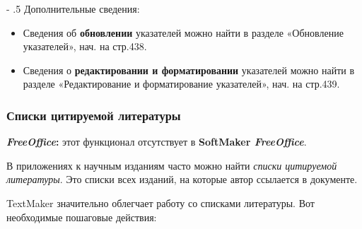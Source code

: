 ﻿\documentclass[a4paper,10pt]{article}
\makeatletter
\renewcommand\paragraph{%
   \@startsection{paragraph}{4}{0mm}%
      {-\baselineskip}%
      {.5\baselineskip}%
      {\normalfont\normalsize\bfseries}}
\makeatother
\begin{document}
\paragraph{Дополнительные сведения:}
\begin{itemize}
 \item Сведения об \textbf{обновлении} указателей можно найти в разделе «Обновление указателей», нач. на стр.438.
 \item Сведения о \textbf{редактировании и форматировании} указателей можно найти в разделе «Редактирование и форматирование указателей», нач. на стр.439.
\end{itemize}

\subsubsection{Списки цитируемой литературы}
\begin{mdframed}[backgroundcolor=pink!50]
\textbf{\textit{FreeOffice}:} этот функционал отсутствует в \textbf{SoftMaker \textit{FreeOffice}}.
\end{mdframed}

В приложениях к научным изданиям часто можно найти \textit{списки цитируемой литературы}. Это списки всех изданий, на которые автор ссылается в документе.

TextMaker значительно облегчает работу со списками литературы. Вот необходимые пошаговые действия:
\end{document}
